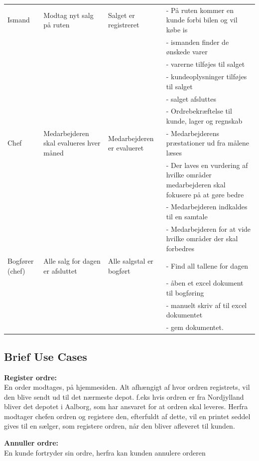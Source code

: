 \begin{center}
\begin{longtable}{ |p{90pt}|p{90pt}|p{90pt}|p{90pt}| }
    \hline
    Ismand & Modtag nyt salg på ruten & Salget er registreret & 
    - På ruten kommer en kunde forbi bilen og vil købe is \\
    &&&
    - ismanden finder de ønskede varer \\
    &&&
    - varerne tilføjes til salget \\
    &&&
    - kundeoplysninger tilføjes til salget \\
    &&&
    - salget afsluttes \\
    &&&
    - Ordrebekræftelse til kunde, lager og regnskab \\
    \hline
    Chef & Medarbejderen skal evalueres hver måned &Medarbejderen er evalueret &
    - Medarbejderens præstationer ud fra målene læses \\
    &&&
    - Der laves en vurdering af hvilke områder medarbejderen skal fokusere på at gøre bedre \\
    &&&
    - Medarbejderen indkaldes til en samtale \\
    &&&
    - Medarbejderen for at vide hvilke områder der skal forbedres \\
    \hline
    Bogfører (chef) & Alle salg for dagen er afsluttet & Alle salgstal er bogført & 
    - Find all tallene for dagen \\
    &&&
    - åben et excel dokument til bogføring \\
    &&&
    - manuelt skriv af til excel dokumentet \\
    &&&
    - gem dokumentet. \\
    \hline
\end{longtable}
\end{center}

\subsection{Brief Use Cases}\label{brief}
\textbf{Register ordre:} \\
En order modtages, på hjemmesiden. Alt afhængigt af hvor ordren registrets, vil den blive sendt ud til det nærmeste depot. f.eks hvis ordren er fra Nordjylland bliver det depotet i Aalborg, som har ansvaret for at ordren skal leveres. Herfra modtager chefen ordren og registere den, efterfuldt af dette, vil en printet seddel gives til en sælger, som registere ordren, når den bliver afleveret til kunden. 

\textbf{Annuller ordre:} \\
En kunde fortryder sin ordre, herfra kan kunden annulere orderen

